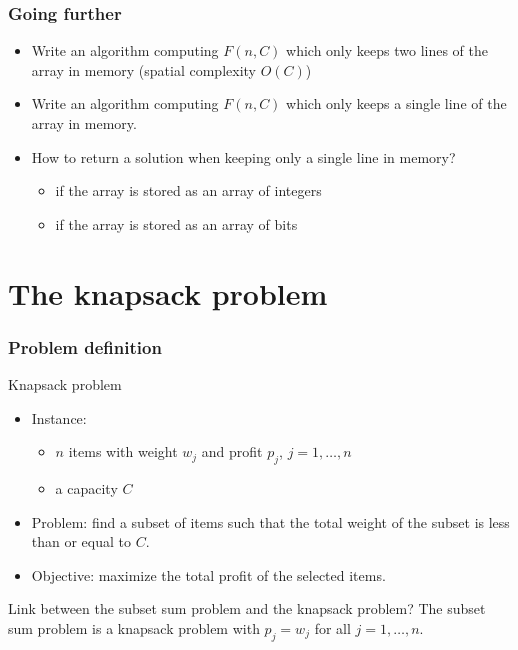 \documentclass{beamer}
\begin{document}
\begin{frame}
  \frametitle{Going further}

  \begin{itemize}
    \item Write an algorithm computing $F(n, C)$ which only keeps two lines of the array in memory (spatial complexity $O(C)$)
    \item Write an algorithm computing $F(n, C)$ which only keeps a single line of the array in memory.
    \item How to return a solution when keeping only a single line in memory?
      \begin{itemize}
        \item if the array is stored as an array of integers
        \item if the array is stored as an array of bits
      \end{itemize}
  \end{itemize}

\end{frame}

\section{The knapsack problem}

\begin{frame}
  \frametitle{Problem definition}

  \begin{block}{Knapsack problem}
    \begin{itemize}
      \item Instance:
        \begin{itemize}
          \item $n$ items with weight \alert{$w_j$} and profit \alert{$p_j$}, $j = 1, \dots, n$
          \item a capacity \alert{$C$}
        \end{itemize}
      \item Problem: find a subset of items such that the total weight of the subset is less than or equal to $C$.
      \item Objective: maximize the total profit of the selected items.
    \end{itemize}
  \end{block}

  \pause
  Link between the subset sum problem and the knapsack problem?
  \pause
  The subset sum problem is a knapsack problem with $p_j = w_j$ for all $j = 1, \dots, n$.
\end{frame}
\end{document}
